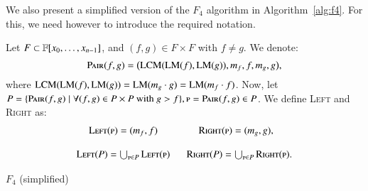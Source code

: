 We also present a simplified version of the $F_4$ algorithm in Algorithm~\ref{alg:f4}. For this, we need however to introduce the required notation.
 \begin{definition}
  Let $F  \subset  {\mathbb F}[x_0,\dots,x_{n-1}]$, and $(f,g) \in F \times F$ with $f \not =g$. We denote:
 $$
 \textsc{Pair}(f,g)=\big(\textsc{LCM}(\textsc{LM}(f),\textsc{LM}(g)), m_f,f,m_g,g\big),
 $$
 where $\textsc{LCM}(\textsc{LM}(f),\textsc{LM}(g))=\textsc{LM}(m_g \cdot g)=\textsc{LM}(m_f \cdot  f)$.
Now, let $P=\{\textsc{Pair}(f,g) \mid \forall (f,g) \in P \times P \mbox{ with } g > f\}, \textsc{p}=\textsc{Pair}(f,g) \in P$. We define \textsc{Left} and \textsc{Right} as:
\[
\begin{array}{cc}
    \textsc{Left}(\textsc{p})  =  (m_f,f)  &  \textsc{Right}(\textsc{p})  =  (m_g,g) ,\\
    & \\
    \textsc{Left}(P) = \bigcup_{\textsc{p} \in P} \textsc{Left}(\textsc{p}) &  \, \, \, \, \textsc{Right}(P) = \bigcup_{\textsc{p} \in P} \textsc{Right}(\textsc{p}).
 \end{array}
\]
 \end{definition}

\begin{algorithm}[ht]
\caption{$F_{4}$ (simplified)} 
\label{alg:f4}
\end{algorithm}

